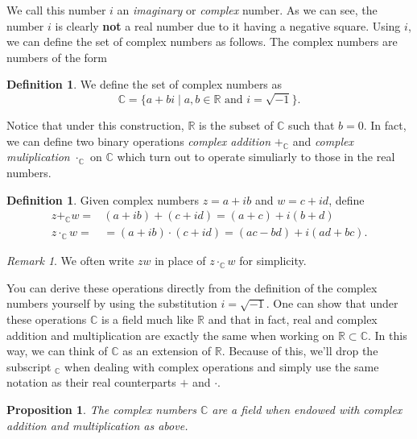 \documentclass[12pt]{article}
\newcommand{\bbR}{\mathbb{R}}
\newcommand{\bbC}{\mathbb{C}}
\newtheorem{prop}[thm]{Proposition}
\theoremstyle{definition}
\newtheorem{defn}[thm]{Definition}
\theoremstyle{remark}
\newtheorem{rem}[thm]{Remark}
\numberwithin{equation}{section}
\begin{document}
We call this number $i$ an \emph{imaginary} or \emph{complex} number. As we can see, the number $i$ is clearly \textbf{not} a real number due to it having a negative square. Using $i$, we can define the set of complex numbers as follows. The complex numbers are numbers of the form 

\begin{defn}
  We define the set of complex numbers as 
\begin{equation}
  \bbC = \{ a + bi \mid a, b \in \bbR \text{ and } i = \sqrt{-1} \}.
\end{equation}
\end{defn}

Notice that under this construction, $\bbR$ is the subset of $\bbC$ such that $b=0$. In fact, we can define two binary operations \emph{complex addition} $+_\bbC$ and \emph{complex muliplication} $\cdot_\bbC$ on $\bbC$ which turn out to operate simuliarly to those in the real numbers.

\begin{defn}
  Given complex numbers $z=a+ib$ and $w=c+id$, define
\begin{align}
  z +_\bbC w=& (a+ib)+(c+id)=(a+c)+i(b+d)\\
  z\cdot_\bbC w=&= (a+ib)\cdot(c+id)=(ac-bd)+ i(ad+bc).
\end{align}
\end{defn}

\begin{rem}
  We often write $zw$ in place of $z\cdot_\bbC w$ for simplicity.
\end{rem}


You can derive these operations directly from the definition of the complex numbers yourself by using the substitution $i = \sqrt{-1}$. One can show that under these operations $\bbC$ is a field much like $\bbR$ and that in fact, real and complex addition and multiplication are exactly the same when working on $\bbR \subset \bbC$. In this way, we can think of $\bbC$ as an extension of $\bbR$. Because of this, we'll drop the subscript $_\bbC$ when dealing with complex operations and simply use the same notation as their real counterparts $+$ and $\cdot$.

\begin{prop}
  The complex numbers $\bbC$ are a field when endowed with complex addition and multiplication as above.
\end{prop}
\end{document}
